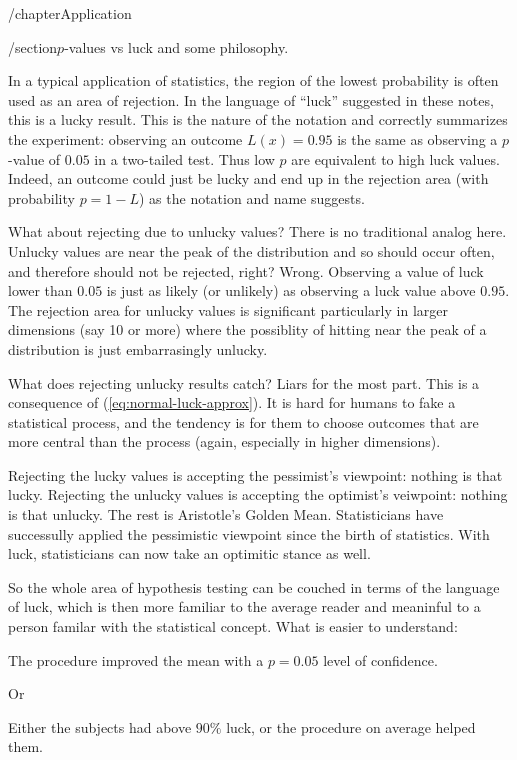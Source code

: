 /chapter{Application}

/section{$p$-values vs luck and some philosophy.}

In a typical application of statistics, the region of the lowest probability is often used as an area of rejection.  In the language of ``luck'' suggested in these notes, this is a lucky result.  This is the nature of the notation and correctly summarizes the experiment: observing an outcome $L(x)=0.95$ is the same as observing a $p$-value of $0.05$ in a two-tailed test.  Thus low $p$ are equivalent to high luck values.  Indeed, an outcome could just be lucky and end up in the rejection area (with probability $p=1-L$) as the notation and name suggests.

What about rejecting due to unlucky values?  There is no traditional analog here.  Unlucky values are near the peak of the distribution and so should occur often, and therefore should not be rejected, right?  Wrong.  Observing a value of luck lower than $0.05$ is just as likely (or unlikely) as observing a luck value above $0.95$.  The rejection area for unlucky values is significant particularly in larger dimensions (say 10 or more) where the possiblity of hitting near the peak of a distribution is just embarrasingly unlucky.

What does rejecting unlucky results catch?  Liars for the most part.  This is a consequence of (\ref{eq:normal-luck-approx}).  It is hard for humans to fake a statistical process, and the tendency is for them to choose outcomes that are more central than the process (again, especially in higher dimensions).

Rejecting the lucky values is accepting the pessimist's viewpoint: nothing is that lucky.  Rejecting the unlucky values is accepting the optimist's veiwpoint: nothing is that unlucky.  The rest is Aristotle's Golden Mean.  Statisticians have successully applied the pessimistic viewpoint since the birth of statistics.  With luck, statisticians can now take an optimitic stance as well.

So the whole area of hypothesis testing can be couched in terms of the language of luck, which is then more familiar to the average reader and meaninful to a person familar with the statistical concept.  What is easier to understand: 
\begin{blockquote}
The procedure improved the mean with a $p=0.05$ level of confidence.
\end{blockquote}
Or
\begin{blockquote}
Either the subjects had above $90\%$ luck, or the procedure on average helped them.
\end{blockquote}

